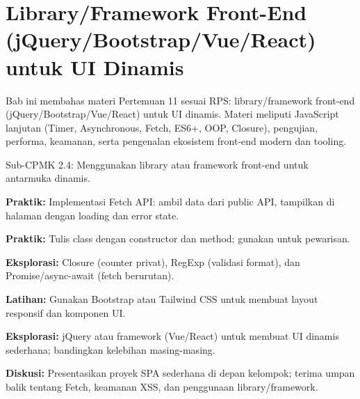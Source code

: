 \documentclass[../main.tex]{subfiles}
\begin{document}
\chapter{Library/Framework Front-End (jQuery/Bootstrap/Vue/React) untuk UI Dinamis}

Bab ini membahas materi Pertemuan 11 sesuai RPS: library/framework front-end (jQuery/Bootstrap/Vue/React) untuk UI dinamis. Materi meliputi JavaScript lanjutan (Timer, Asynchronous, Fetch, ES6+, OOP, Closure), pengujian, performa, keamanan, serta pengenalan ekosistem front-end modern dan tooling.

\begin{subcpmk}
  \item Sub-CPMK 2.4: Menggunakan library atau framework front-end untuk antarmuka dinamis.
\end{subcpmk}



















\begin{aktivitas}
  \item \textbf{Praktik:} Implementasi Fetch API: ambil data dari public API, tampilkan di halaman dengan loading dan error state.
  \item \textbf{Praktik:} Tulis class  dengan constructor dan method; gunakan  untuk pewarisan.
  \item \textbf{Eksplorasi:} Closure (counter privat), RegExp (validasi format), dan Promise/async-await (fetch berurutan).
  \item \textbf{Latihan:} Gunakan Bootstrap atau Tailwind CSS untuk membuat layout responsif dan komponen UI.
  \item \textbf{Eksplorasi:} jQuery atau framework (Vue/React) untuk membuat UI dinamis sederhana; bandingkan kelebihan masing-masing.
  \item \textbf{Diskusi:} Presentasikan proyek SPA sederhana di depan kelompok; terima umpan balik tentang Fetch, keamanan XSS, dan penggunaan library/framework.
\end{aktivitas}
\end{document}
